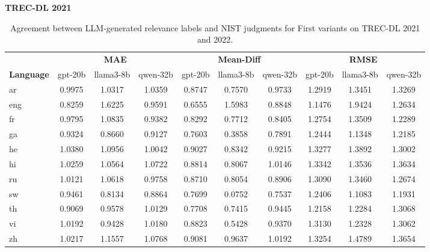 \begin{table}[t]
\centering
\caption{Agreement between LLM-generated relevance labels and NIST judgments for First variants on TREC-DL 2021 and 2022.}
\label{tab:metrics_first}
\setlength{\tabcolsep}{3.5pt}
\footnotesize
\textbf{TREC-DL 2021} \\
\vspace{0.2em}
\begin{tabular}{lccccccccc}
\toprule
 & \multicolumn{3}{c}{\textbf{MAE}} & \multicolumn{3}{c}{\textbf{Mean-Diff}} & \multicolumn{3}{c}{\textbf{RMSE}} \\
\cmidrule(lr){2-4} \cmidrule(lr){5-7} \cmidrule(lr){8-10}
\textbf{Language} & gpt-20b & llama3-8b & qwen-32b & gpt-20b & llama3-8b & qwen-32b & gpt-20b & llama3-8b & qwen-32b \\
\midrule
ar & 0.9975 & 1.0317 & 1.0359 & 0.8747 & 0.7570 & 0.9733 & 1.2919 & 1.3451 & 1.3269 \\
eng & 0.8259 & 1.6225 & 0.9591 & 0.6555 & 1.5983 & 0.8848 & 1.1476 & 1.9424 & 1.2634 \\
fr & 0.9795 & 1.0835 & 0.9382 & 0.8292 & 0.7712 & 0.8405 & 1.2754 & 1.3509 & 1.2289 \\
ga & 0.9324 & 0.8660 & 0.9127 & 0.7603 & 0.3858 & 0.7891 & 1.2444 & 1.1348 & 1.2185 \\
he & 1.0380 & 1.0956 & 1.0042 & 0.9027 & 0.8342 & 0.9215 & 1.3277 & 1.3892 & 1.3002 \\
hi & 1.0259 & 1.0564 & 1.0722 & 0.8814 & 0.8067 & 1.0146 & 1.3342 & 1.3536 & 1.3634 \\
ru & 1.0121 & 1.0618 & 0.9758 & 0.8710 & 0.8054 & 0.8906 & 1.3090 & 1.3460 & 1.2674 \\
sw & 0.9461 & 0.8134 & 0.8864 & 0.7699 & 0.0752 & 0.7537 & 1.2406 & 1.1083 & 1.1931 \\
th & 0.9069 & 0.9578 & 1.0129 & 0.7708 & 0.7415 & 0.9445 & 1.2158 & 1.2284 & 1.3068 \\
vi & 1.0192 & 0.9428 & 1.0180 & 0.8823 & 0.5428 & 0.9370 & 1.3130 & 1.2328 & 1.3062 \\
zh & 1.0217 & 1.1557 & 1.0768 & 0.9081 & 0.9637 & 1.0192 & 1.3254 & 1.4789 & 1.3654 \\
\bottomrule
\end{tabular}
\vspace{2em}


\end{table}
